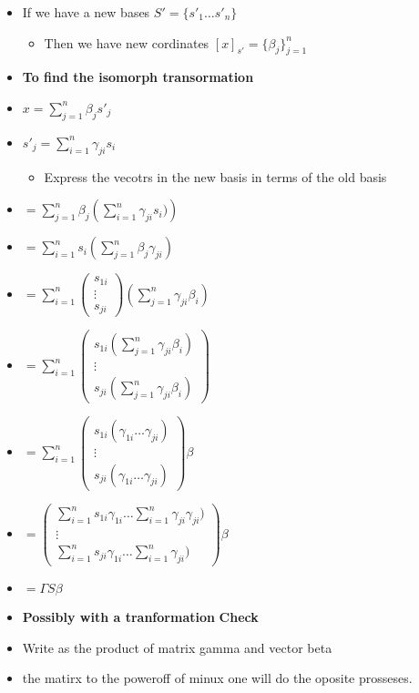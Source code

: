 \documentclass[twocolumn]{article}
\providecommand{\tightlist}{%
  \setlength{\itemsep}{0pt}\setlength{\parskip}{0pt}}
\begin{document}
\begin{itemize}
\tightlist
\item
  If we have a new bases \(S'= \{s'_1 \dots s'_n\}\)

  \begin{itemize}
  \tightlist
  \item
    Then we have new cordinates \([x]_{s'} = \{\beta_j\}_{j=1}^n\)
  \end{itemize}
\item
  \textbf{To find the isomorph transormation}
\item
  \(x = \sum_{j=1}^n \beta_j s'_j\)
\item
  \(s'_j = \sum_{i=1}^n \gamma_{ji} s_i\)

  \begin{itemize}
  \tightlist
  \item
    Express the vecotrs in the new basis in terms of the old basis
  \end{itemize}
\item
  \(= \sum_{j=1}^n \beta_j \left(\sum_{i=1}^n \gamma_{ji} s_i)\right)\)
\item
  \(= \sum_{i=1}^n s_i \left(\sum_{j=1}^n \beta_j \gamma_{ji} \right)\)
\item
  \(= \sum_{i=1}^n \begin{pmatrix} s_{1i} \\ \vdots \\ s_{ji} \end{pmatrix}\left( \sum_{j=1}^n \gamma_{ji} \beta_i \right)\)
\item
  \(= \sum_{i=1}^n \begin{pmatrix} s_{1i} \left( \sum_{j=1}^n \gamma_{ji} \beta_i \right)\\ \vdots \\ s_{ji} \left( \sum_{j=1}^n \gamma_{ji} \beta_i \right)\end{pmatrix}\)
\item
  \(= \sum_{i=1}^n \begin{pmatrix} s_{1i} ( \gamma_{1i} \dots \gamma_{ji} )\\ \vdots \\ s_{ji} (\gamma_{1i} \dots \gamma_{ji})\end{pmatrix} \beta\)
\item
  \(= \begin{pmatrix} \sum_{i=1}^n s_{1i} \gamma_{1i} \dots \sum_{i=1}^n \gamma_{ji} \gamma_{ji} )\\ \vdots \\ \sum_{i=1}^n s_{ji} \gamma_{1i} \dots \sum_{i=1}^n\gamma_{ji})\end{pmatrix} \beta\)
\item
  \(= \Gamma S \beta\)
\item
  \textbf{Possibly with a tranformation} \textbf{Check}
\item
  Write as the product of matrix gamma and vector beta
\item
  the matirx to the poweroff of minux one will do the oposite prosseses.
\end{itemize}
\end{document}
